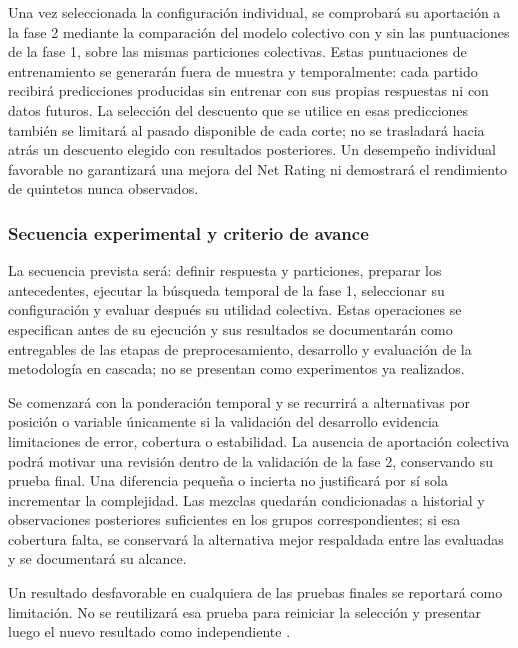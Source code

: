 Una vez seleccionada la configuración individual, se comprobará su aportación a la fase 2 mediante la comparación del modelo colectivo con y sin las puntuaciones de la fase 1, sobre las mismas particiones colectivas. Estas puntuaciones de entrenamiento se generarán fuera de muestra y temporalmente: cada partido recibirá predicciones producidas sin entrenar con sus propias respuestas ni con datos futuros. La selección del descuento que se utilice en esas predicciones también se limitará al pasado disponible de cada corte; no se trasladará hacia atrás un descuento elegido con resultados posteriores. Un desempeño individual favorable no garantizará una mejora del Net Rating ni demostrará el rendimiento de quintetos nunca observados.

\subsubsection*{Secuencia experimental y criterio de avance}
La secuencia prevista será: definir respuesta y particiones, preparar los antecedentes, ejecutar la búsqueda temporal de la fase 1, seleccionar su configuración y evaluar después su utilidad colectiva. Estas operaciones se especifican antes de su ejecución y sus resultados se documentarán como entregables de las etapas de preprocesamiento, desarrollo y evaluación de la metodología en cascada; no se presentan como experimentos ya realizados.

Se comenzará con la ponderación temporal y se recurrirá a alternativas por posición o variable únicamente si la validación del desarrollo evidencia limitaciones de error, cobertura o estabilidad. La ausencia de aportación colectiva podrá motivar una revisión dentro de la validación de la fase 2, conservando su prueba final. Una diferencia pequeña o incierta no justificará por sí sola incrementar la complejidad. Las mezclas quedarán condicionadas a historial y observaciones posteriores suficientes en los grupos correspondientes; si esa cobertura falta, se conservará la alternativa mejor respaldada entre las evaluadas y se documentará su alcance.

Un resultado desfavorable en cualquiera de las pruebas finales se reportará como limitación. No se reutilizará esa prueba para reiniciar la selección y presentar luego el nuevo resultado como independiente \cite{cawley2010selection}.
